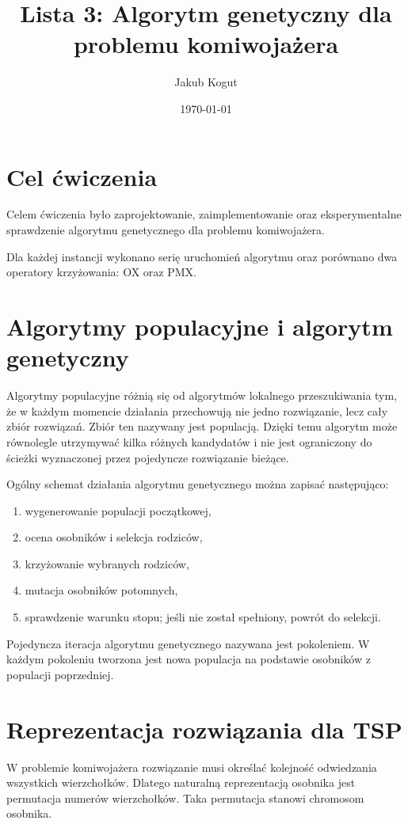 \documentclass[12pt,a4paper]{article}
\title{\textbf{Lista 3: Algorytm genetyczny dla problemu komiwojażera}}
\author{Jakub Kogut}
\date{\today}
\begin{document}
\maketitle

\section{Cel ćwiczenia}

Celem ćwiczenia było zaprojektowanie, zaimplementowanie oraz eksperymentalne sprawdzenie algorytmu genetycznego dla problemu komiwojażera.

Dla każdej instancji wykonano serię uruchomień algorytmu oraz porównano dwa operatory krzyżowania: OX oraz PMX.

\section{Algorytmy populacyjne i algorytm genetyczny}

Algorytmy populacyjne różnią się od algorytmów lokalnego przeszukiwania tym, że w każdym momencie działania przechowują nie jedno rozwiązanie, lecz cały zbiór rozwiązań. Zbiór ten nazywany jest populacją. Dzięki temu algorytm może równolegle utrzymywać kilka różnych kandydatów i nie jest ograniczony do ścieżki wyznaczonej przez pojedyncze rozwiązanie bieżące.

Ogólny schemat działania algorytmu genetycznego można zapisać następująco:
\begin{enumerate}
    \item wygenerowanie populacji początkowej,
    \item ocena osobników i selekcja rodziców,
    \item krzyżowanie wybranych rodziców,
    \item mutacja osobników potomnych,
    \item sprawdzenie warunku stopu; jeśli nie został spełniony, powrót do selekcji.
\end{enumerate}

Pojedyncza iteracja algorytmu genetycznego nazywana jest pokoleniem. W każdym pokoleniu tworzona jest nowa populacja na podstawie osobników z populacji poprzedniej.

\section{Reprezentacja rozwiązania dla TSP}

W problemie komiwojażera rozwiązanie musi określać kolejność odwiedzania wszystkich wierzchołków. Dlatego naturalną reprezentacją osobnika jest permutacja numerów wierzchołków. Taka permutacja stanowi chromosom osobnika.
\end{document}

